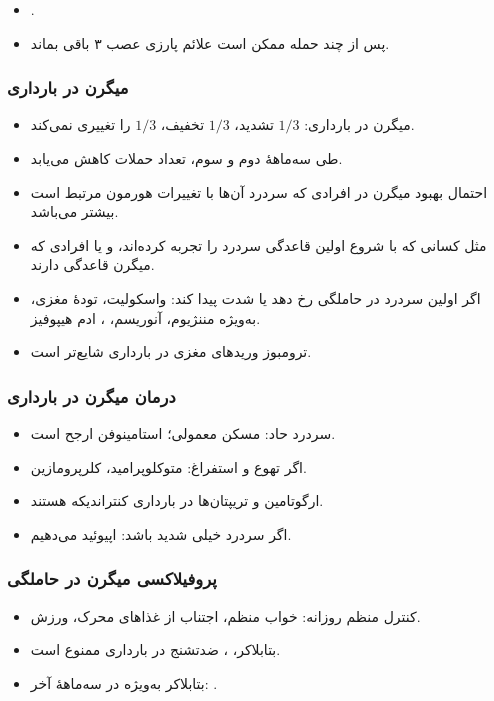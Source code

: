 \begin{itemize}
\item {}.
\item پس از چند حمله ممکن است علائم پارزی عصب ۳ باقی بماند.
\end{itemize}
\subsubsection{میگرن در بارداری}
\begin{itemize}
\item میگرن در بارداری: $1/3$ تشدید، $1/3$ تخفیف، $1/3$ را تغییری نمی‌کند.
\item طی سه‌ماههٔ دوم و سوم، تعداد حملات کاهش می‌یابد.
\item احتمال بهبود میگرن در افرادی که سردرد آن‌ها با تغییرات هورمون مرتبط است بیشتر می‌باشد.
\item مثل کسانی که با شروع اولین قاعدگی سردرد را تجربه کرده‌اند، و یا افرادی که میگرن قاعدگی دارند.
\item اگر اولین سردرد در حاملگی رخ دهد یا شدت پیدا کند: واسکولیت، تودهٔ مغزی، به‌ویژه مننژیوم، آنوریسم، ، ادم هیپوفیز.
\item ترومبوز وریدهای مغزی در بارداری شایع‌تر است.
\end{itemize}
\subsubsection{درمان میگرن در بارداری}
\begin{itemize}
\item سردرد حاد: مسکن معمولی؛ استامینوفن ارجح است.
\item اگر تهوع و استفراغ: متوکلوپرامید، کلرپرومازین.
\item ارگوتامین و تریپتان‌ها در بارداری کنتراندیکه هستند.
\item اگر سردرد خیلی شدید باشد: اپیوئید می‌دهیم.
\end{itemize}
\subsubsection{پروفیلاکسی میگرن در حاملگی}
\begin{itemize}
\item کنترل منظم روزانه: خواب منظم، اجتناب از غذاهای محرک، ورزش.
\item بتابلاکر، ، ضدتشنج در بارداری ممنوع است.
\item بتابلاکر به‌ویژه در سه‌ماههٔ آخر: .
\end{itemize}


